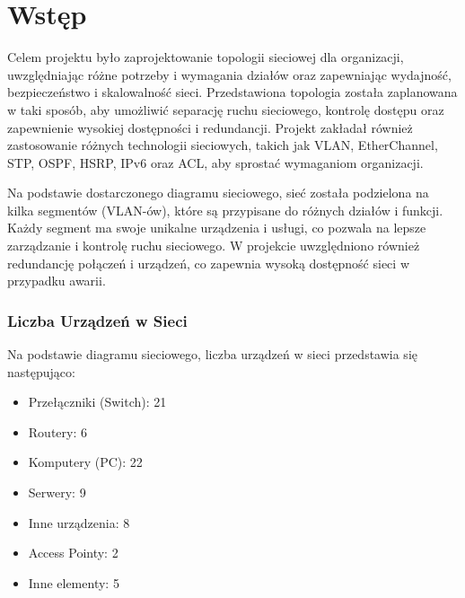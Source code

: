 ﻿\chapter*{Wstęp}

Celem projektu było zaprojektowanie topologii sieciowej dla organizacji, uwzględniając różne potrzeby i wymagania działów oraz zapewniając wydajność, bezpieczeństwo i skalowalność sieci. Przedstawiona topologia została zaplanowana w taki sposób, aby umożliwić separację ruchu sieciowego, kontrolę dostępu oraz zapewnienie wysokiej dostępności i redundancji. Projekt zakładał również zastosowanie różnych technologii sieciowych, takich jak VLAN, EtherChannel, STP, OSPF, HSRP, IPv6 oraz ACL, aby sprostać wymaganiom organizacji.

Na podstawie dostarczonego diagramu sieciowego, sieć została podzielona na kilka segmentów (VLAN-ów), które są przypisane do różnych działów i funkcji. Każdy segment ma swoje unikalne urządzenia i usługi, co pozwala na lepsze zarządzanie i kontrolę ruchu sieciowego. W projekcie uwzględniono również redundancję połączeń i urządzeń, co zapewnia wysoką dostępność sieci w przypadku awarii.

\subsection*{Liczba Urządzeń w Sieci}

Na podstawie diagramu sieciowego, liczba urządzeń w sieci przedstawia się następująco:

\begin{itemize}
\item Przełączniki (Switch): 21
\item Routery: 6
\item Komputery (PC): 22
\item Serwery: 9
\item Inne urządzenia: 8
\item Access Pointy: 2
\item Inne elementy: 5
\end{itemize}
